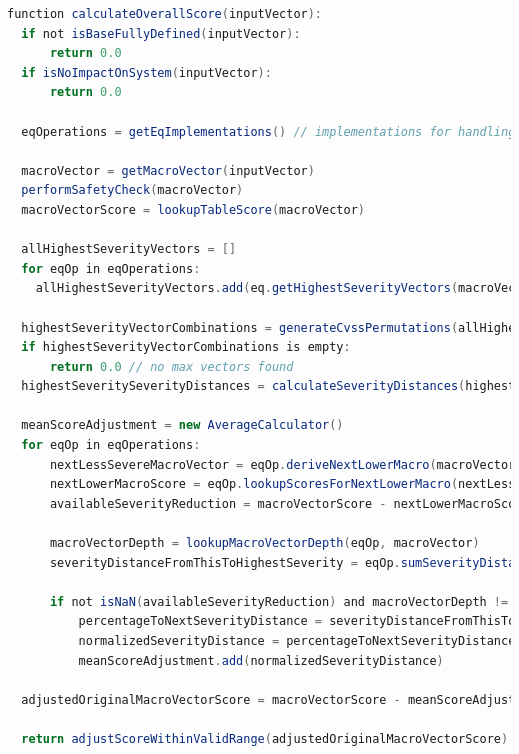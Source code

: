 \begin{lstlisting}[language=Java, label={lst:cvss-typescript-cvss-4P0-calculateOverallScore-pseudocode}, caption={CVSS 4.0 Score-Berechnung Pseudocode}, basicstyle=\scriptsize]
function calculateOverallScore(inputVector):
  if not isBaseFullyDefined(inputVector):
      return 0.0
  if isNoImpactOnSystem(inputVector):
      return 0.0

  eqOperations = getEqImplementations() // implementations for handling equivalence groups

  macroVector = getMacroVector(inputVector)
  performSafetyCheck(macroVector)
  macroVectorScore = lookupTableScore(macroVector)

  allHighestSeverityVectors = []
  for eqOp in eqOperations:
    allHighestSeverityVectors.add(eq.getHighestSeverityVectors(macroVector))

  highestSeverityVectorCombinations = generateCvssPermutations(allHighestSeverityVectors)
  if highestSeverityVectorCombinations is empty:
      return 0.0 // no max vectors found
  highestSeveritySeverityDistances = calculateSeverityDistances(highestSeverityVectorCombinations)

  meanScoreAdjustment = new AverageCalculator()
  for eqOp in eqOperations:
      nextLessSevereMacroVector = eqOp.deriveNextLowerMacro(macroVector)
      nextLowerMacroScore = eqOp.lookupScoresForNextLowerMacro(nextLessSevereMacroVector)
      availableSeverityReduction = macroVectorScore - nextLowerMacroScore

      macroVectorDepth = lookupMacroVectorDepth(eqOp, macroVector)
      severityDistanceFromThisToHighestSeverity = eqOp.sumSeverityDistances(highestSeveritySeverityDistances)

      if not isNaN(availableSeverityReduction) and macroVectorDepth != 0.0:
          percentageToNextSeverityDistance = severityDistanceFromThisToHighestSeverity / macroVectorDepth
          normalizedSeverityDistance = percentageToNextSeverityDistance * availableSeverityReduction
          meanScoreAdjustment.add(normalizedSeverityDistance)

  adjustedOriginalMacroVectorScore = macroVectorScore - meanScoreAdjustment.average()

  return adjustScoreWithinValidRange(adjustedOriginalMacroVectorScore)
\end{lstlisting}
